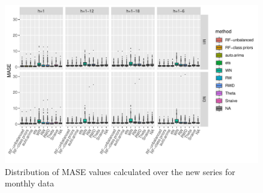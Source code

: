 \documentclass[11pt,a4paper,]{article}
\begin{document}
\begin{figure}[H]

{\centering \includegraphics[width=\textwidth]{figure/monthlybox-1} 

}

\caption{Distribution of MASE values calculated over the new series for monthly data}\label{fig:monthlybox}
\end{figure}

\printbibliography
\end{document}
